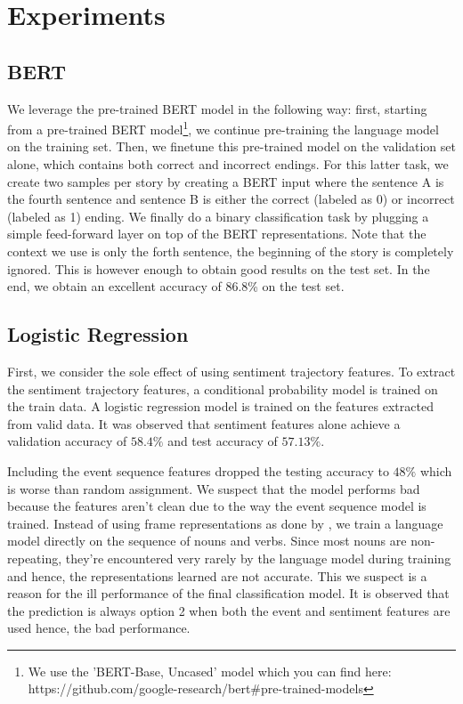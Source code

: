 \documentclass{article}
\begin{document}
\section{Experiments}

\subsection{BERT}

We leverage the pre-trained BERT model in the following way: first, starting from a pre-trained BERT model\footnote{We use the 'BERT-Base, Uncased' model which you can find here: https://github.com/google-research/bert\#pre-trained-models}, we continue pre-training the language model on the training set.
Then, we finetune this pre-trained model on the validation set alone, which contains both correct and incorrect endings. For this latter task, we create two samples per story by creating a BERT input where the sentence A is the fourth sentence and sentence B is either the correct (labeled as 0) or incorrect (labeled as 1) ending. 
We finally do a binary classification task by plugging a simple feed-forward layer on top of the BERT representations.
Note that the context we use is only the forth sentence, the beginning of the story is completely ignored. This is however enough to obtain good results on the test set. In the end, we obtain an excellent accuracy of 86.8\% on the test set.

\subsection{Logistic Regression}

First, we consider the sole effect of using sentiment trajectory features. To extract the sentiment trajectory  features, a conditional probability model is trained on the train data. A logistic regression model is trained on the features extracted from valid data. It was observed that sentiment features alone achieve a validation accuracy of $58.4\%$ and test accuracy of $57.13\%$.

Including the event sequence features dropped the testing accuracy to $48\%$ which is worse than random assignment. We suspect that the model performs bad because the features aren't clean due to the way the event sequence model is trained. Instead of using frame representations as done by \cite{hcm}, we train a language model directly on the sequence of nouns and verbs. Since most nouns are non-repeating, they're encountered very rarely by the language model during training and hence, the representations learned are not accurate. This we suspect is a reason for the ill performance of the final classification model. It is observed that the prediction is always option 2 when both the event and sentiment features are used hence, the bad performance.
\end{document}
